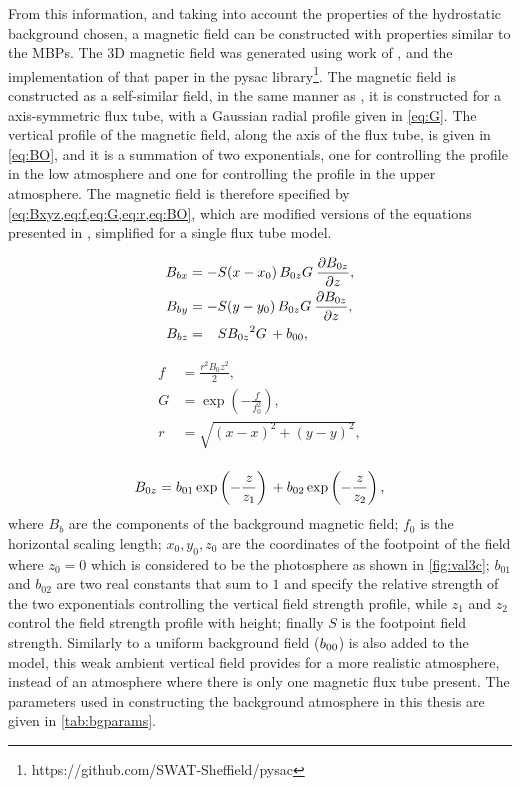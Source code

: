 From this information, and taking into account the properties of the hydrostatic background chosen, a magnetic field can be constructed with properties similar to the MBPs.
The 3D magnetic field was generated using work of \cite{gent2013, gent2014}, and the implementation of that paper in the pysac library\footnote{https://github.com/SWAT-Sheffield/pysac}.
The magnetic field is constructed as a self-similar field, in the same manner as \cite{schluter1958}, it is constructed for a axis-symmetric flux tube, with a Gaussian radial profile given in \cref{eq:G}.
The vertical profile of the magnetic field, along the axis of the flux tube, is given in \cref{eq:BO}, and it is a summation of two exponentials, one for controlling the profile in the low atmosphere and one for controlling the profile in the upper atmosphere.
The magnetic field is therefore specified by \cref{eq:Bxyz,eq:f,eq:G,eq:r,eq:BO}, which are modified versions of the equations presented in \cite{gent2014}, simplified for a single flux tube model.

\begin{equation}\label{eq:Bxyz}
\begin{aligned}
B_{bx} &= -S(x-x_0) {\, {B_{0z}}{G} \:} \frac{\partial {B_{0z}}}{\partial z},
\\
B_{by} &= -S(y-y_0) {\, {B_{0z}}{G} \:} \frac{\partial {B_{0z}}}{\partial z},
\\        
B_{bz} &= \phantom{-}S{{B_{0z}}^2{G}  \,} + {b_{00}},
\end{aligned}
\end{equation}


\begin{align}
f &= \frac{r^2 B_0z^2}{2},  \label{eq:f}
\\
G &= \exp\left(-\frac{f}{f_0^2}\right),  \label{eq:G}
\\
r \,   &= \sqrt{(x-x )^2+(y-y )^2},\\  \label{eq:r}
\end{align}

\begin{equation}\label{eq:BO}
{B_{0z}} = 
{b_{01}}\exp\left(-\frac{z}{{z_{1}}}\right)\,
+
{b_{02}}\exp\left(-\frac{z}{{z_{2}}}\right),
\end{equation}
where $B_{b}$ are the components of the background magnetic field; $f_0$ is the horizontal scaling length; $x_0,y_0,z_0$ are the coordinates of the footpoint of the field where $z_0=0$ which is considered to be the photosphere as shown in \cref{fig:val3c}; $b_{01}$ and $b_{02}$ are two real constants that sum to $1$ and specify the relative strength of the two exponentials controlling the vertical field strength profile, while $z_1$ and $z_2$ control the field strength profile with height; finally $S$ is the footpoint field strength.
Similarly to \cite{gent2014} a uniform background field (${b_{00}}$) is also added to the model, this weak ambient vertical field provides for a more realistic atmosphere, instead of an atmosphere where there is only one magnetic flux tube present.
The parameters used in constructing the background atmosphere in this thesis are given in \cref{tab:bgparams}.

